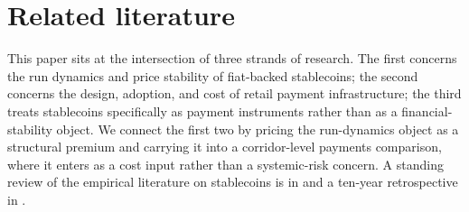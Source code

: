\section{Related literature}\label{sec:literature}

This paper sits at the intersection of three strands of research. The first concerns the run dynamics and price stability of fiat-backed stablecoins; the second concerns the design, adoption, and cost of retail payment infrastructure; the third treats stablecoins specifically as payment instruments rather than as a financial-stability object. We connect the first two by pricing the run-dynamics object as a structural premium and carrying it into a corridor-level payments comparison, where it enters as a cost input rather than a systemic-risk concern. A standing review of the empirical literature on stablecoins is in \citet{ante_fiedler_etal_2023} and a ten-year retrospective in \citet{dionysopoulos_urquhart_2024}.

